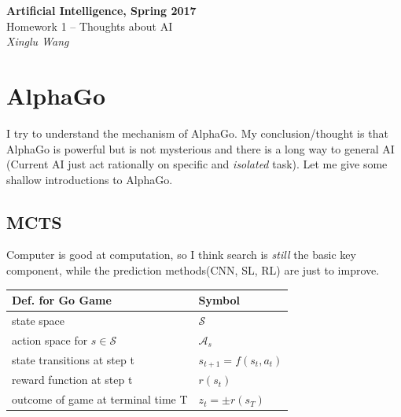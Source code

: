 \documentclass{mcmthesis}
\begin{document}
\begin{center}
	\textbf{\LARGE{Artificial Intelligence, Spring 2017}} \\
	\vspace{0.2em}
	\large{Homework 1 -- Thoughts about AI} \\
	\vspace{1em}
	{\itshape Xinglu Wang}  
\end{center}
\section{AlphaGo}\label{sec1}
I try to understand the mechanism of AlphaGo\cite{1}. My conclusion/thought is that AlphaGo is powerful but is not mysterious and there is a long way to general AI (Current AI just  act rationally on specific and \textit{isolated} task). Let me give some shallow introductions to AlphaGo.


\subsection{MCTS}
Computer is good at computation, so I think search is \textit{still} the basic key component, while the prediction methods(CNN, SL, RL) are just to improve.
\begin{center}

\begin{tabular}{ll}
	\toprule
	Def. for Go Game & Symbol  \\ 
	\midrule
	state space & $\mathcal{S}$  \\ 
	 
	action space for $s \in \mathcal{S}$& $\mathcal{A}_s$ \\ 
	
	state transitions at step t& $s_{t+1}=f(s_t,a_t)$ \\ 
	 
	reward function at step t & $r(s_t)$  \\
	
	outcome of game at terminal time T & $z_t=\pm r(s_T)$  \\
	\bottomrule 
\end{tabular} 
\end{center}
\end{document}
